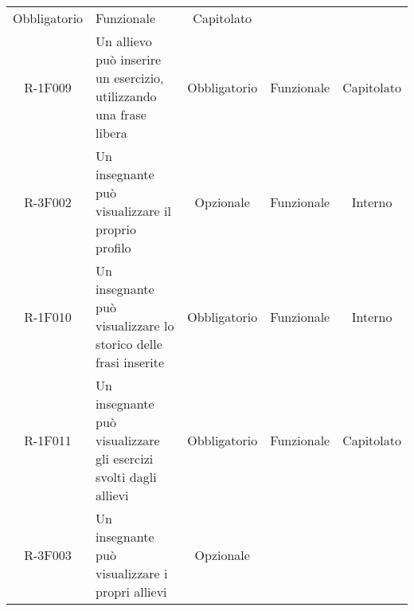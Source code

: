 \begin{tabularx}{\textwidth}{cXccc}
Obbligatorio &

Funzionale &

Capitolato \\
R-1F009 &


Un allievo può inserire un esercizio, utilizzando una frase libera &

Obbligatorio &

Funzionale &

Capitolato \\
R-3F002 &

Un insegnante può visualizzare il proprio profilo &

Opzionale &

Funzionale &

Interno \\
R-1F010 &

Un insegnante può visualizzare lo storico delle frasi inserite &

Obbligatorio &

Funzionale &

Interno \\
R-1F011 &

Un insegnante può visualizzare gli esercizi svolti dagli allievi &

Obbligatorio &

Funzionale &

Capitolato \\
R-3F003 &

Un insegnante può visualizzare i propri allievi &

Opzionale &


\end{tabularx}
